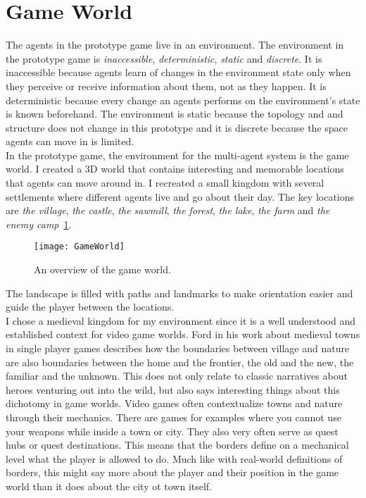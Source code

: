 \section{Game World}
The agents in the prototype game live in an environment. The environment in the prototype game is \textit{inaccessible}, \textit{deterministic}, \textit{static} and \textit{discrete}. It is inaccessible because agents learn of changes in the environment state only when they perceive or receive information about them, not as they happen. It is deterministic because every change an agents performs on the environment's state is known beforehand. The environment is static because the topology and and structure does not change in this prototype and it is discrete because the space agents can move in is limited.\\
In the prototype game, the environment for the multi-agent system is the game world. I created a 3D world that contains interesting and memorable locations that agents can move around in. I recreated a small kingdom with several settlements where different agents live and go about their day. The key locations are \textit{the village}, \textit{the castle}, \textit{the sawmill}, \textit{the forest}, \textit{the lake}, \textit{the farm} and \textit{the enemy camp}~\ref{fig:gameWorld}.
\begin{figure}
	\centering
	\texttt{[image: GameWorld]}
	\caption{An overview of the game world.}
	\label{fig:gameWorld}
\end{figure}
The landscape is filled with paths and landmarks to make orientation easier and guide the player between the locations.\\
I chose a medieval kingdom for my environment since it is a well understood and established context for video game worlds. Ford in his work about medieval towns in single player games describes how the boundaries between village and nature are also boundaries between the home and the frontier, the old and the new, the familiar and the unknown. This does not only relate to classic narratives about heroes venturing out into the wild, but also says interesting things about this dichotomy in game worlds. Video games often contextualize towns and nature through their mechanics. There are games for examples where you cannot use your weapons while inside a town or city. They also very often serve as quest hubs or quest destinations. This means that the borders define on a mechanical level what the player is allowed to do. Much like with real-world definitions of borders, this might say more about the player and their position in the game world than it does about the city ot town itself.~\cite{Ford2019}
